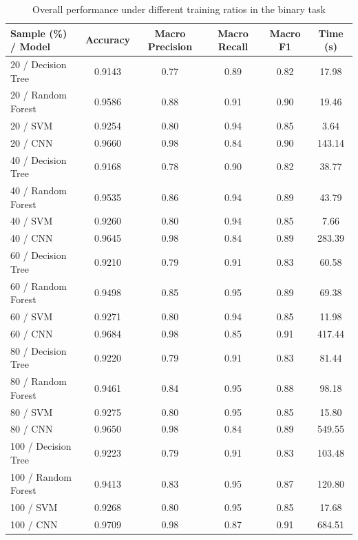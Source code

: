 \begin{table}[H]
    \centering
    \caption{Overall performance under different training ratios in the binary task}
    \label{tab:sample-binary-summary}
    \begin{tabular}{lccccc}
        \toprule
        Sample (\%) / Model & Accuracy & Macro Precision & Macro Recall & Macro F1 & Time (s) \\
        \midrule
        20 / Decision Tree & 0.9143 & 0.77 & 0.89 & 0.82 & 17.98 \\
        20 / Random Forest & 0.9586 & 0.88 & 0.91 & 0.90 & 19.46 \\
        20 / SVM           & 0.9254 & 0.80 & 0.94 & 0.85 & 3.64  \\
        20 / CNN           & 0.9660 & 0.98 & 0.84 & 0.90 & 143.14 \\
        40 / Decision Tree & 0.9168 & 0.78 & 0.90 & 0.82 & 38.77 \\
        40 / Random Forest & 0.9535 & 0.86 & 0.94 & 0.89 & 43.79 \\
        40 / SVM           & 0.9260 & 0.80 & 0.94 & 0.85 & 7.66  \\
        40 / CNN           & 0.9645 & 0.98 & 0.84 & 0.89 & 283.39 \\
        60 / Decision Tree & 0.9210 & 0.79 & 0.91 & 0.83 & 60.58 \\
        60 / Random Forest & 0.9498 & 0.85 & 0.95 & 0.89 & 69.38 \\
        60 / SVM           & 0.9271 & 0.80 & 0.94 & 0.85 & 11.98 \\
        60 / CNN           & 0.9684 & 0.98 & 0.85 & 0.91 & 417.44 \\
        80 / Decision Tree & 0.9220 & 0.79 & 0.91 & 0.83 & 81.44 \\
        80 / Random Forest & 0.9461 & 0.84 & 0.95 & 0.88 & 98.18 \\
        80 / SVM           & 0.9275 & 0.80 & 0.95 & 0.85 & 15.80 \\
        80 / CNN           & 0.9650 & 0.98 & 0.84 & 0.89 & 549.55 \\
        100 / Decision Tree & 0.9223 & 0.79 & 0.91 & 0.83 & 103.48 \\
        100 / Random Forest & 0.9413 & 0.83 & 0.95 & 0.87 & 120.80 \\
        100 / SVM           & 0.9268 & 0.80 & 0.95 & 0.85 & 17.68 \\
        100 / CNN           & 0.9709 & 0.98 & 0.87 & 0.91 & 684.51 \\
        \bottomrule
    \end{tabular}
\end{table}

